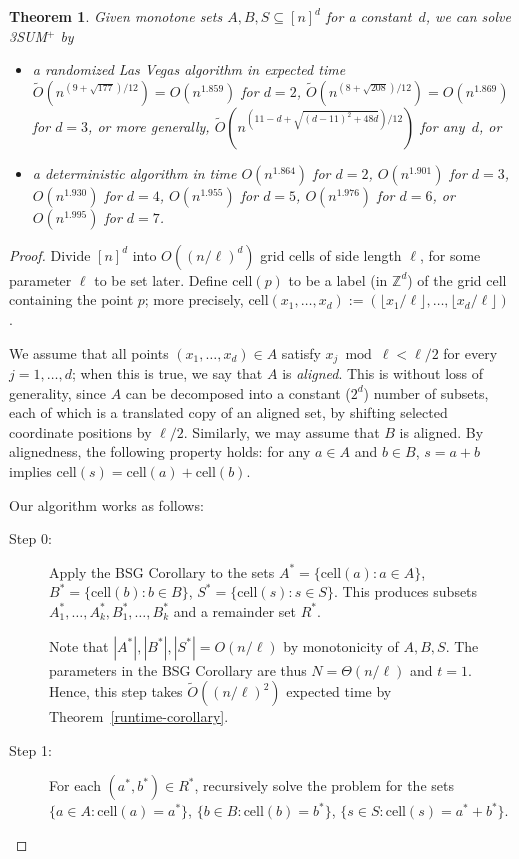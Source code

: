 \documentclass[11pt]{article}
\newtheorem{theorem}{Theorem}[section]
\newcommand{\Z}{\mathbb{Z}}
\newcommand{\OO}{\widetilde{O}}
\newcommand{\CELL}{\textrm{cell}}
\begin{document}
\begin{theorem}\label{thm-monotone}
Given monotone sets $A,B,S\subseteq [n]^d$ for a constant~$d$,
we can solve 3SUM$^+$ by
\begin{itemize}
\item[\rm (i)] a randomized Las Vegas algorithm in expected time
$\OO(n^{(9+\sqrt{177})/12})=O(n^{1.859})$ for $d=2$,
$\OO(n^{(8+\sqrt{208})/12})=O(n^{1.869})$ for $d=3$,
or more generally,
$\OO(n^{(11-d+\sqrt{(d-11)^2+48d})/12})$ for any~$d$, or
\item[\rm (ii)] a deterministic algorithm in time
$O(n^{1.864})$ for $d=2$,
$O(n^{1.901})$ for $d=3$,
$O(n^{1.930})$ for $d=4$,
$O(n^{1.955})$ for $d=5$,
$O(n^{1.976})$ for $d=6$,
or $O(n^{1.995})$ for $d=7$.
\end{itemize}
\end{theorem}
\begin{proof}
Divide $[n]^d$ into $O((n/\ell)^d)$
grid cells of side length $\ell$, for some parameter $\ell$ to be set later.
Define $\CELL(p)$ to be a label (in $\Z^d$) of the grid cell
containing the point $p$; more precisely,
$\CELL(x_1,\ldots,x_d) := (\lfloor x_1/\ell\rfloor,\ldots, \lfloor x_d/\ell\rfloor)$.

We assume that all points $(x_1,\ldots,x_d)\in A$
satisfy $x_j\bmod{\ell} < \ell/2$ for every $j=1,\ldots, d$;
when this is true, we say
that $A$ is \emph{aligned}.  This is without loss of generality,
since $A$ can be decomposed into a constant ($2^d$) number of subsets, each of which is a translated copy of an aligned set,
by shifting selected coordinate positions by $\ell/2$.
Similarly, we may assume that $B$ is aligned.
By alignedness, the following property holds: for any $a\in A$ and
$b\in B$, $s=a+b$ implies $\CELL(s)=\CELL(a)+\CELL(b)$.

Our algorithm works as follows:
\begin{description}
\item[Step 0:]
Apply the BSG Corollary to the sets $A^*=\{\CELL(a):a\in A\}$,
$B^*=\{\CELL(b):b\in B\}$, $S^*=\{\CELL(s):s\in S\}$.
This produces subsets $A_1^*,\ldots,A_k^*,B_1^*,\ldots,B_k^*$ and a remainder set $R^*$.

Note that $|A^*|,|B^*|,|S^*| =O(n/\ell)$ by monotonicity of $A,B,S$.
The parameters in the BSG Corollary are thus $N=\Theta(n/\ell)$
and $t=1$.
Hence, this step takes $\OO((n/\ell)^2)$ expected time
by Theorem~\ref{runtime-corollary}.
\item[Step 1:]
For each $(a^*,b^*)\in R^*$,
recursively solve the problem for the sets
$\{a\in A: \CELL(a)=a^*\}$, $\{b\in B: \CELL(b)=b^*\}$,
$\{s\in S: \CELL(s)= a^*+b^*\}$.


\end{description}
\end{proof}
\end{document}
